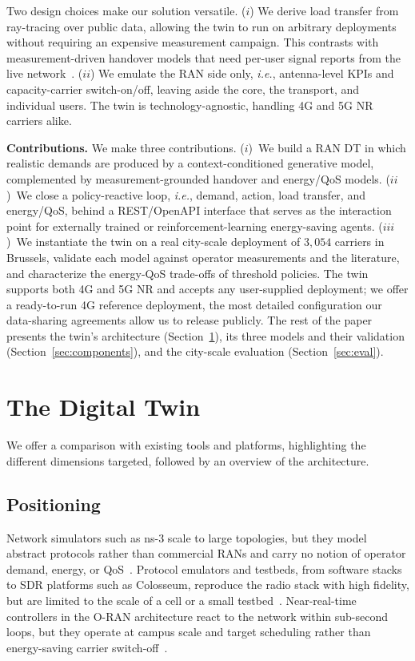 \documentclass[sigconf, 10pt]{acmart}
\newcommand{\ie}{\textit{i.e.},\xspace}
\begin{document}
Two design choices make our solution versatile. 
($i$) We derive load transfer from ray-tracing over public data, allowing the twin to run on arbitrary deployments without requiring an expensive measurement campaign. This contrasts with measurement-driven handover models that need per-user signal reports from the live network~\cite{user_transfer_5g}.
($ii$) We emulate the \ac{RAN} side only, \ie antenna-level \acp{KPI} and capacity-carrier switch-on/off, leaving aside the core, the transport, and individual users. 
The twin is technology-agnostic, handling 4G and 5G NR carriers alike.

\noindent\textbf{Contributions.} We make three contributions.
($i$)~We build a \ac{RAN} \ac{DT} in which realistic demands are produced by a context-conditioned generative model, complemented by measurement-grounded handover and energy/\ac{QoS} models. 
($ii$)~We close a policy-reactive loop, \ie demand, action, load transfer, and energy/\ac{QoS}, behind a REST/OpenAPI interface that serves as the interaction point for externally trained or reinforcement-learning energy-saving agents.
($iii$)~We instantiate the twin on a real city-scale deployment of $3{,}054$ carriers in Brussels, validate each model against operator measurements and the literature, and characterize the energy-\ac{QoS} trade-offs of threshold policies. 
The twin supports both 4G and 5G NR and accepts any user-supplied deployment; we offer a ready-to-run 4G reference deployment, the most detailed configuration our data-sharing agreements allow us to release publicly.
The rest of the paper presents the twin's architecture (Section~\ref{sec:arch}), its three models and their validation (Section~\ref{sec:components}), and the city-scale evaluation (Section~\ref{sec:eval}).

\section{The Digital Twin}
\label{sec:arch}

We offer a comparison with existing tools and platforms, highlighting the different dimensions targeted, followed by an overview of the architecture. 

\subsection{Positioning}
Network simulators such as ns-3 scale to large topologies, but they model abstract protocols rather than commercial \acp{RAN} and carry no notion of operator demand, energy, or QoS~\cite{ns3}.
Protocol emulators and testbeds, from software stacks to SDR platforms such as Colosseum, reproduce the radio stack with high fidelity, but are limited to the scale of a cell or a small testbed~\cite{colosseum}. Near-real-time controllers in the O-RAN architecture react to the network within sub-second loops, but they operate at campus scale and target scheduling rather than energy-saving carrier switch-off~\cite{oran_disrupting}.
\end{document}
